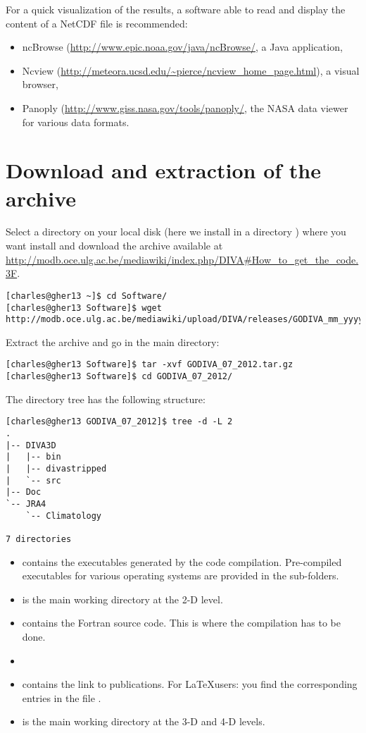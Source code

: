 For a quick visualization of the results, a software able to read and display the content of a NetCDF  file is recommended:
\begin{itemize}
\item ncBrowse (\url{http://www.epic.noaa.gov/java/ncBrowse/}, a Java application,
\item Ncview (\url{http://meteora.ucsd.edu/~pierce/ncview_home_page.html}), a visual browser, 
\item Panoply (\url{http://www.giss.nasa.gov/tools/panoply/}, the NASA data viewer for various data formats.
\end{itemize}


\section{Download and extraction of the archive}
Select a directory on your local disk (here we install in a directory ) where you want install \diva and download the archive available at \url{http://modb.oce.ulg.ac.be/mediawiki/index.php/DIVA#How_to_get_the_code.3F}.

\begin{lstlisting}[style=Bash]
[charles@gher13 ~]$ cd Software/
[charles@gher13 Software]$ wget http://modb.oce.ulg.ac.be/mediawiki/upload/DIVA/releases/GODIVA_mm_yyyy.tar.gz
\end{lstlisting}

Extract the archive and go in the main directory:
\begin{lstlisting}[style=Bash]
[charles@gher13 Software]$ tar -xvf GODIVA_07_2012.tar.gz
[charles@gher13 Software]$ cd GODIVA_07_2012/
\end{lstlisting}

The directory tree has the following structure: %
\begin{lstlisting}[style=Bash]
[charles@gher13 GODIVA_07_2012]$ tree -d -L 2
.
|-- DIVA3D
|   |-- bin
|   |-- divastripped
|   `-- src
|-- Doc
`-- JRA4
    `-- Climatology

7 directories
\end{lstlisting}


\begin{itemize}
\item {} contains the executables generated by the code compilation. Pre-compiled executables for various operating systems are provided in the sub-folders.
\item {} is the main working directory at the 2-D level. 
\item {} contains the Fortran source code. This is where the compilation has to be done.
\item[]
\item {} contains the link to publications. For \LaTeX users: you find the corresponding \BibTeX  entries in the file .
\item {} is the main working directory at the 3-D and 4-D levels.
\end{itemize}

